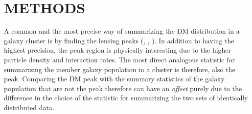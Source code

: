 \section{METHODS}\label{sec:methods}
A common and the most precise way of summarizing the DM distribution in a
galaxy cluster is by finding the lensing peaks 
(\citealt{Medezinski2013}, \citealt{Markevitch2004}, \citealt{Zitrin13}).
In addition to having the highest precision, the peak region is physically 
interesting due to the higher particle density and interaction rates. 
The most direct analogous statistic for summarizing the member galaxy
population in a cluster is therefore, also the peak. 
Comparing the DM peak with the summary statistics of the galaxy population that
are not the peak therefore can have an {\it offset} purely due to the difference in
the choice of the statistic for summarizing the two sets of identically
distributed data. 

